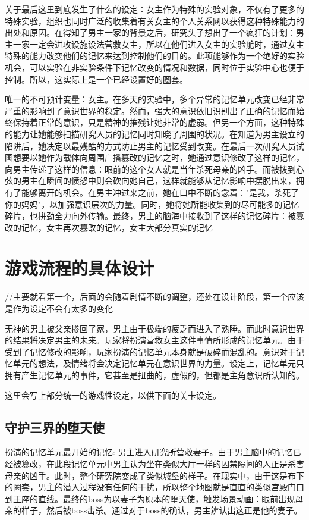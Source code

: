 \documentclass[12pt, a4paper]{article}
\begin{document}
    关于最后这里到底发生了什么的设定：女主作为特殊的实验对象，不仅有了更多的特殊实验，组织也同时广泛的收集着有关女主的个人关系网以获得这种特殊能力的出处和原因。在得知了男主一家的背景之后，研究头子想出了一个疯狂的计划：男主一家一定会进攻设施设法营救女主，所以在他们进入女主的实验舱时，通过女主特殊的能力改变他们的记忆来达到控制他们的目的。此项能够作为一个绝好的实验机会，可以实验在非实验条件下记忆改变的情况和数据，同时位于实验中心也便于控制。所以，这实际上是一个已经设置好的圈套。

    唯一的不可预计变量：女主。在多天的实验中，多个异常的记忆单元改变已经非常严重的影响到了意识世界的稳定。然而，强大的意识依旧识别出了正确的记忆而始终保持着正常的意识，只是精神的摧残让她非常的虚弱。但另一个方面，这种特殊的能力让她能够扫描研究人员的记忆同时知晓了周围的状况。在知道为男主设立的陷阱后，她决定以最残酷的方式防止男主的记忆受到改变。在最后一次研究人员试图想要以她作为载体向周围广播篡改的记忆之时，她通过意识修改了这样的记忆，向男主传递了这样的信息：眼前的这个女人就是当年杀死母亲的凶手。而被拨到心弦的男主在瞬间的愤怒中则会砍向她自己，这样就能够从记忆影响中摆脱出来，拥有了能够离开的机会。在男主冲过来之前，她在口中不断的念着："是我，杀死了你的妈妈"，以加强意识层次的力量。同时，她将她所能收集到的尽可能多的记忆碎片，也拼劲全力向外传输。最终，男主的脑海中接收到了这样的记忆碎片：被篡改的记忆，女主再次篡改的记忆，女主大部分真实的记忆

    \newpage 
    \section*{游戏流程的具体设计}

    //主要就看第一个，后面的会随着剧情不断的调整，还处在设计阶段，第一个应该是作为设定不会有太多的变化

    无神的男主被父亲掺回了家，男主由于极端的疲乏而进入了熟睡。而此时意识世界的结果将决定男主的未来。玩家将扮演营救女主这件事情所形成的记忆单元。由于受到了记忆修改的影响，玩家扮演的记忆单元本身就是破碎而混乱的。意识对于记忆单元的想法，及情绪将会决定记忆单元在意识世界的力量。设定上，记忆单元只拥有产生记忆单元的事件，它甚至是扭曲的，虚假的，但都是主角意识所认知的。

    这里会写上部分统一的游戏性设定，以供下面的关卡设定。

    \subsection*{守护三界的堕天使}
            扮演的记忆单元最开始的记忆: 男主进入研究所营救妻子。由于男主脑中的记忆已经被篡改，在此段记忆单元中男主认为坐在类似大厅一样的囚禁隔间的人正是杀害母亲的凶手。此时，整个研究院变成了类似城堡的样子。在现实中，由于这是布下的圈套，男主的潜入过程没有任何的干扰，所以整个地图就是直直的类似宫殿门口到王座的直线。最终的boss为以妻子为原本的堕天使，触发场景动画：眼前出现母亲的样子，然后被boss击杀。通过对于boss的确认，男主辨认出这正是他的妻子。
\end{document}
